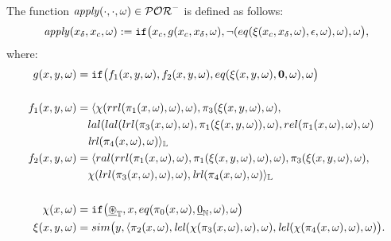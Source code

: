 \begin{defn}[Apply]
The function $\mathit{apply}(\cdot,\cdot,\omega)\in \mathcal{POR}^-$
is defined as follows:
$$
\mathit{apply}(x_\delta,x_c,\omega) := \mathtt{if}\big(x_c, g(x_c,x_\delta, \omega),
\lnot(eq(\xi(x_c,x_\delta,\omega),\epsilon,\omega),\omega),
\omega\big),
$$
where:
\begin{align*}
g(x,y,\omega) &= \mathtt{if}\big(f_{1}(x,y, \omega), f_{2}(x,y, \omega),
eq(\xi(x,y,\omega),\zero,\omega),
\omega\big) \\
%
%
\\
f_{1}(x,y, \omega) &= \langle \chi(rrl(\pi_1(x,\omega),\omega),
\omega), \pi_3(\xi(x,y,\omega),\omega), \\
%
& \ \ \ lal(lal(lrl(\pi_3(x,\omega),\omega),
\pi_1(\xi(x,y,\omega)),\omega), rel(\pi_1(x,\omega),\omega),\omega) \\
%
& \ \ \ \lrl (\pi_4(x,\omega),\omega)\rangle_\Ll \\
%
f_{2}(x,y, \omega) &= \langle ral(rrl(\pi_1(x,\omega),\omega),
\pi_1(\xi(x,y,\omega),\omega),\omega),
\pi_3(\xi(x,y,\omega),\omega), \\
%
& \ \ \ \chi(lrl(\pi_3(x,\omega),\omega),\omega),
\lrl (\pi_4(x,\omega),\omega)\rangle_\Ll \\
%
\\
\chi(x,\omega) &= \mathtt{if}\big(\underline \circledast_\Tt,
x, eq(\pi_0(x,\omega), \underline{0}_\Nat,
\omega),\omega\big) \\
%
\xi(x,y,\omega) &= sim\big(y,\langle \pi_2(x,\omega),
\lel(\chi(\pi_3(x,\omega),\omega),\omega),
\lel(\chi(\pi_4(x, \omega), \omega), \omega)\big).
\end{align*}
\end{defn}


